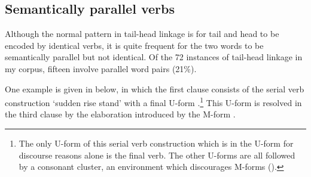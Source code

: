 \subsection{Semantically parallel verbs}\label{sec:ParVer}
Although the normal pattern in tail-head linkage is for tail and head to be encoded by identical verbs,
it is quite frequent for the two words to
be semantically parallel but not identical.
Of the 72 instances of tail-head linkage in my corpus,
fifteen involve parallel word pairs (21\%).

One example is given in  below,
in which the first clause consists of the serial verb construction
 `sudden rise stand' with a final U-form .\footnote{
		The only U-form of this serial verb construction which is in the U-form
		for discourse reasons alone is the final verb.
		The other U-forms are all followed by a consonant cluster,
		an environment which discourages M-forms ().}
This U-form is resolved in the third clause by the elaboration
introduced by the M-form .


\begin{exe}
	\label{ex:120715-4, 0.25-0.27}
	\begin{xlist}
		\label{ex:120715-4, 0.25}
		\label{ex:120715-4, 0.27a}
	\end{xlist}
\end{exe}

